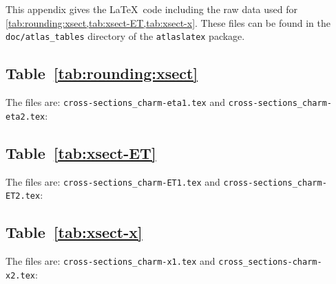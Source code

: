\documentclass[REPORT=false, UKenglish]{atlasdoc}
\begin{document}
This appendix gives the \LaTeX\ code including the raw data used for
\cref{tab:rounding:xsect,tab:xsect-ET,tab:xsect-x}.
These files can be found in the \texttt{doc/atlas\_tables} directory
of the \texttt{atlaslatex} package.

\subsection{Table~\protect\ref{tab:rounding:xsect}}

The files are: \texttt{cross-sections\_charm-eta1.tex} and
\texttt{cross-sections\_charm-eta2.tex}:




\clearpage
\subsection{Table~\protect\ref{tab:xsect-ET}}

The files are: \texttt{cross-sections\_charm-ET1.tex} and
\texttt{cross-sections\_charm-ET2.tex}:



\clearpage
\subsection{Table~\protect\ref{tab:xsect-x}}

The files are: \texttt{cross-sections\_charm-x1.tex} and
\texttt{cross\_sections-charm-x2.tex}:


\end{document}
